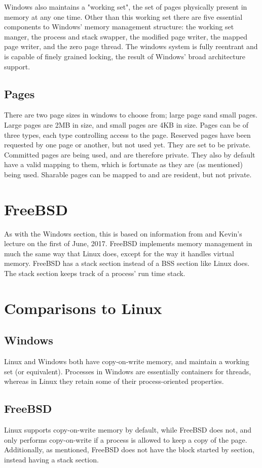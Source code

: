 \documentclass[10pt,draftclsnofoot,onecolumn,compsoc]{IEEEtran}
\begin{document}
	Windows also maintains a "working set", the set of pages physically present in memory at any one time. Other than this working set there are five essential components to Windows' memory management structure: the working set manger, the process and stack swapper, the modified page writer, the mapped page writer, and the zero page thread. The windows system is fully reentrant and is capable of finely grained locking, the result of Windows' broad architecture support. 
	
	\subsection{Pages}
	
	There are two page sizes in windows to choose from; large page sand small pages. Large pages are 2MB in size, and small pages are 4KB in size. Pages can be of three types, each type controlling access to the page. Reserved pages have been requested by one page or another, but not used yet. They are set to be private. Committed pages are being used, and are therefore private. They also by default have a valid mapping to them, which is fortunate as they are (as mentioned) being used. Sharable pages can be mapped to and are resident, but not private.
	
	\section{FreeBSD}
	
	As with the Windows section, this is based on information from \cite{BSD} and Kevin's lecture on the first of June, 2017. FreeBSD implements memory management in much the same way that Linux does, except for the way it handles virtual memory. FreeBSD has a stack section instead of a BSS section like Linux does. The stack section keeps track of a process' run time stack.
		
	\section{Comparisons to Linux}
	
	\subsection{Windows}
	
	Linux and Windows both have copy-on-write memory, and maintain a working set (or equivalent). Processes in Windows are essentially containers for threads, whereas in Linux they retain some of their process-oriented properties.
	
	\subsection{FreeBSD}
	
	Linux supports copy-on-write memory by default, while FreeBSD does not, and only performs copy-on-write if a process is allowed to keep a copy of the page. Additionally, as mentioned, FreeBSD does not have the block started by section, instead having a stack section.
	
	
		
	

\end{document}
